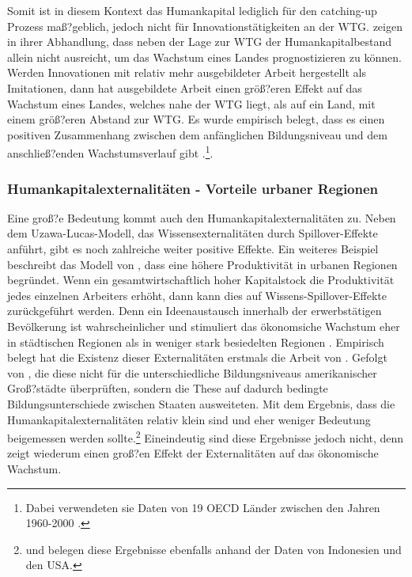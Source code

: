 %
Somit ist in diesem Kontext das Humankapital lediglich für den catching-up Prozess maß?geblich, jedoch nicht für Innovationstätigkeiten an der WTG. \cite{Krueger.2001} zeigen in ihrer Abhandlung, dass neben der Lage zur WTG  der Humankapitalbestand allein nicht ausreicht, um das Wachstum eines Landes prognostizieren zu können.\\
%
Werden Innovationen mit relativ mehr ausgebildeter Arbeit hergestellt als Imitationen, dann hat ausgebildete Arbeit einen größ?eren Effekt auf das Wachstum eines Landes, welches nahe der WTG liegt, als auf ein Land, mit einem größ?eren Abstand zur WTG. Es wurde empirisch belegt, dass es einen positiven Zusammenhang zwischen dem anfänglichen Bildungsniveau und dem anschließ?enden Wachstumsverlauf gibt \cite{Vandenbussche.2006}.\footnote{Dabei verwendeten sie Daten von 19 OECD Länder zwischen den Jahren 1960-2000 \cite{Vandenbussche.2006}.}.
%
\subsubsection*{Humankapitalexternalitäten - Vorteile urbaner Regionen}
Eine groß?e Bedeutung kommt auch den Humankapitalexternalitäten zu. Neben dem Uzawa-Lucas-Modell, das Wissensexternalitäten durch Spillover-Effekte anführt, gibt es noch zahlreiche weiter positive Effekte. Ein weiteres Beispiel beschreibt das Modell von \cite{Jacobs.1970}, dass eine höhere Produktivität in urbanen Regionen begründet.
Wenn ein gesamtwirtschaftlich hoher Kapitalstock die Produktivität jedes einzelnen Arbeiters erhöht, dann kann dies auf Wissens-Spillover-Effekte zurückgeführt werden. Denn ein Ideenaustausch innerhalb der erwerbstätigen Bevölkerung ist wahrscheinlicher und stimuliert das ökonomsiche Wachstum eher in städtischen Regionen als in weniger stark besiedelten Regionen \cite{Azariades.1990,Lucas.1988}. Empirisch belegt hat die Existenz dieser Externalitäten erstmals die Arbeit von \cite{Rauch.}. Gefolgt von \cite{Acemoglu.2000}, die diese nicht für die unterschiedliche Bildungsniveaus amerikanischer Groß?städte überprüften, sondern die These auf dadurch bedingte Bildungsunterschiede zwischen Staaten ausweiteten. Mit dem Ergebnis, dass die Humankapitalexternalitäten relativ klein sind und eher weniger Bedeutung beigemessen werden sollte.\footnote{\cite{Duflo.2004} und \cite{Ciccone.Apr} belegen diese Ergebnisse ebenfalls anhand der Daten von Indonesien und den USA.} Eineindeutig sind diese Ergebnisse jedoch nicht, denn \cite{Moretti.2004} zeigt wiederum einen groß?en Effekt der Externalitäten auf das ökonomische Wachstum.
